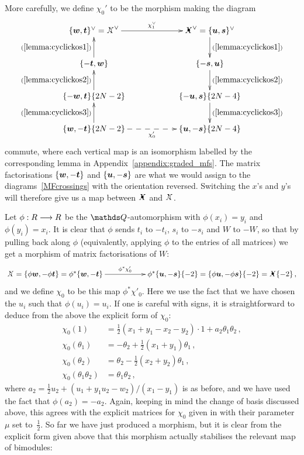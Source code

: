 \documentclass{compositio}
\theoremstyle{definition}
\numberwithin{equation}{section}
\begin{document}
More carefully, we define $\chi_0'$ to be the morphism making the diagram
\begin{equation}\label{eq:chi1dualischi0}
\xymatrix@C+3pc{
\{ \bs{w}, \bs{t} \}\mdual = \Xcirc\mdual \ar[r]^-{\chi_1\mdual} & \Xbul\mdual = \{ \bs{u}, \bs{s} \}\mdual \ar[d]^-{(\ref{lemma:cyclickos1})}\\
\{ -\bs{t}, \bs{w} \} \ar[u]^-{(\ref{lemma:cyclickos1})} & \{ -\bs{s}, \bs{u} \} \ar[d]^-{(\ref{lemma:cyclickos2})}\\
\{ -\bs{w}, \bs{t} \}\{ 2N - 2 \} \ar[u]^-{(\ref{lemma:cyclickos2})} & \{ -\bs{u}, \bs{s} \} \{ 2N - 4 \} \ar[d]^-{(\ref{lemma:cyclickos3})}\\
\{ \bs{w}, -\bs{t} \}\{ 2N - 2 \} \ar@{-->}[r]_-{\chi_0'} \ar[u]^-{(\ref{lemma:cyclickos3})} & \{ \bs{u}, -\bs{s} \}\{ 2N - 4 \}
}
\end{equation}
commute, where each vertical map is an isomorphism labelled by the corresponding lemma in Appendix~\ref{appendix:graded_mfs}. The matrix factorisations $\{ \boldsymbol{w}, -\boldsymbol{t} \}$ and $\{ \boldsymbol{u}, -\boldsymbol{s} \}$ are what we would assign to the diagrams~\eqref{MFcrossings} with the orientation reversed. Switching the $x$'s and $y$'s will therefore give us a map between $\Xbul$ and $\Xcirc$.

Let $\phi: R \longrightarrow R$ be the $\nQ$-automorphism with $\phi(x_i) = y_i$ and $\phi(y_i) = x_i$. It is clear that $\phi$ sends $t_i$ to $-t_i$, $s_i$ to $-s_i$ and $W$ to $-W$, so that by pulling back along $\phi$ (equivalently, applying $\phi$ to the entries of all matrices) we get a morphism of matrix factorisations of $W$: 
\[
\xymatrix{
\Xcirc = \{ \phi\bs{w}, -\phi \bs{t} \} = \phi^*\{ \bs{w}, -\bs{t} \} \ar[rr]^-{\phi^* \chi'_0} & & \phi^*\{ \bs{u}, -\bs{s} \}\{-2\} = \{ \phi \bs{u}, -\phi \bs{s} \}\{-2\} = \Xbul\{-2\} \, ,
}
\]
and we define $\chi_0$ to be this map $\phi^* \chi'_0$. Here we use the fact that we have chosen the $u_i$ such that $\phi(u_i) = u_i$. If one is careful with signs, it is straightforward to deduce from the above the explicit form of $\chi_0$:
\begin{align}
\chi_0(1) &= \frac{1}{2}(x_1 + y_1 - x_2 - y_2) \cdot 1 + a_2 \theta_1 \theta_2 \, ,\nonumber \\
\chi_0(\theta_1) &= -\theta_2 + \frac{1}{2}(x_1 + y_1) \theta_1\, ,\nonumber \\
\chi_0(\theta_2) &= \theta_2 - \frac{1}{2}(x_2 + y_2)\theta_1\, , \nonumber \\
\chi_0(\theta_1\theta_2) &= \theta_1\theta_2\,, \label{eq:chi0defn}
\end{align}
where $a_2 = \frac{1}{2}u_2 + (u_1 + y_1 u_2 - w_2)/(x_1-y_1)$ is as before, and we have used the fact that $\phi(a_2) = -a_2$. Again, keeping in mind the change of basis discussed above, this agrees with the explicit matrices for $\chi_0$ given in \cite[p.50]{kr0401268} with their parameter~$\mu$ set to~$\frac{1}{2}$. So far we have just produced a morphism, but it is clear from the explicit form given above that this morphism actually stabilises the relevant map of bimodules:
\end{document}
